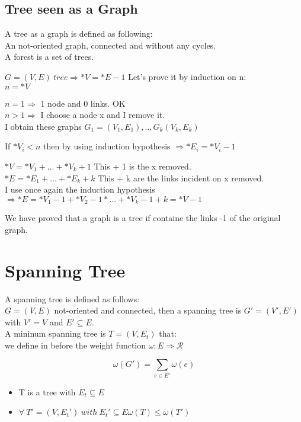 \documentclass{article}
\begin{document}
\subsection{Tree seen as a Graph}
A tree as a graph is defined as following:\\
An not-oriented graph, connected and without any cycles.\\
A forest is a set of trees.\\
\begin{large}
$G = (V,E) \ tree \Rightarrow *V= *E - 1$
Let's prove it by induction on n:\\
$n=*V$

$n=1 \Rightarrow $ 1 node and 0 links. OK\\
$n > 1 \Rightarrow$ I choose a node x and I remove it.\\
I obtain these graphs $G_1=(V_1,E_1),..,G_k(V_k,E_k)$

If $*V_i <n$ then by using induction hypothesis $\Rightarrow *E_i = *V_i -1$

$*V = *V_1 + \ldots + *V_k + 1$ This + 1 is the x removed.\\
$*E = *E_1 + \ldots + *E_k + k$ This + k are the links incident on x removed.\\
I use once again the induction hypothesis $\Rightarrow *E= *V_1 -1 + *V_2 -1 * \ldots + *V_k -1 + k = *V -1$
\end{large}
We have proved that a graph is a tree if containe the links -1 of the original graph.
\section{Spanning Tree}
\begin{large}
A spanning tree is defined as follows:\\
$G = (V,E)$ not-oriented and connected, then a spanning tree is $G'=(V',E')$ with $V'=V$ and $E' \subseteq E$.\\
A mininum spanning tree is $T=(V,E_t)$ that:\\
we define in before the weight function $\omega: E \Rightarrow \mathcal{R}$

$$\omega(G') = \sum_{e \in E'} \omega(e)$$
\begin{itemize}
\item T is a tree with $E_t \subseteq E$
\item $\forall \ T'=(V,E_t') \ with \ E_t' \subseteq E \omega(T) \leq \omega(T')$
\end{itemize}
\end{large} 
\end{document}
